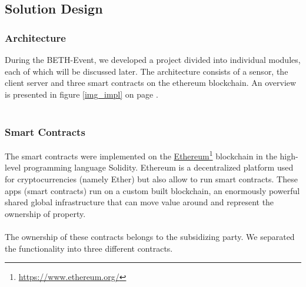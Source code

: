\documentclass[11pt]{article}
\begin{document}
\subsection{Solution Design}
\subsubsection{Architecture}
During the BETH-Event, we developed a project divided into individual modules, each of which will be discussed later. The architecture consists of a sensor, the client server and three smart contracts on the ethereum blockchain. An overview is presented in figure \ref{img_impl} on page \pageref{img_impl}.\\\\


\subsubsection{Smart Contracts}
The smart contracts were implemented on the \hyperref[https://www.ethereum.org/]{Ethereum}\footnote{\href{https://www.ethereum.org/}{https://www.ethereum.org/}} blockchain in the high-level programming language Solidity. Ethereum is a decentralized platform used for cryptocurrencies (namely Ether) but also allow to run smart contracts. These apps (smart contracts) run on a custom built blockchain, an enormously powerful shared global infrastructure that can move value around and represent the ownership of property.\cite{23}\\\\
The ownership of these contracts belongs to the subsidizing party.
We separated the functionality into three different contracts.
\end{document}
